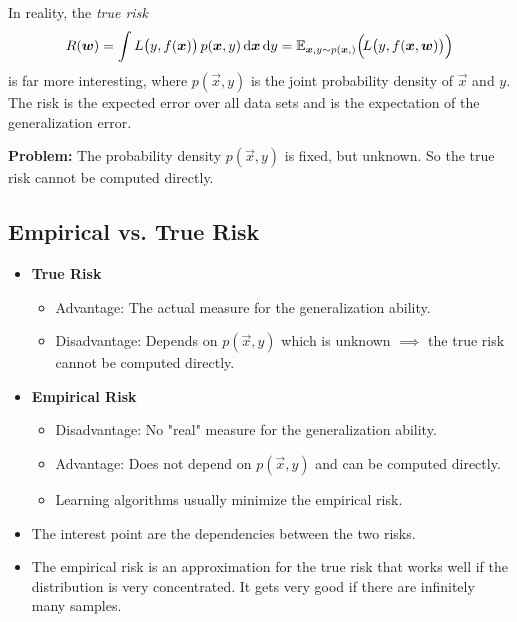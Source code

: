 		In reality, the \emph{true risk}
		\begin{equation}
			R(\bm{w}) = \int L\big(y, f(\bm{x})\big) \, p(\bm{x}, y) \dd{\bm{x}} \dd{y} = \mathbb{E}_{ \bm{x}, y \sim p(\bm{x}, ) }\Big(\! L\big(y, f(\bm{x}, \bm{w})\big) \Big)
		\end{equation}
		is far more interesting, where \( p(\vec{x}, y) \) is the joint probability density of \(\vec{x}\) and \(y\). The risk is the expected error over all data sets and is the expectation of the generalization error.

		\textbf{Problem:} The probability density \( p(\vec{x}, y) \) is fixed, but unknown. So the true risk cannot be computed directly.

		\subsection{Empirical vs. True Risk}
			\begin{itemize}
				\item \textbf{True Risk}
					\begin{itemize}
						\item Advantage: The actual measure for the generalization ability.
						\item Disadvantage: Depends on \( p(\vec{x}, y) \) which is unknown \( \implies \) the true risk cannot be computed directly.
					\end{itemize}
				\item \textbf{Empirical Risk}
					\begin{itemize}
						\item Disadvantage: No "real" measure for the generalization ability.
						\item Advantage: Does not depend on \( p(\vec{x}, y) \) and can be computed directly.
						\item Learning algorithms usually minimize the empirical risk.
					\end{itemize}
				\item The interest point are the dependencies between the two risks.
				\item The empirical risk is an approximation for the true risk that works well if the distribution is very concentrated. It gets very good if there are infinitely many samples.
			\end{itemize}

